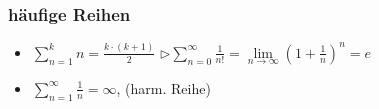     \subsubsection{häufige Reihen}
        \vspace{0em}
        \begin{itemize}
            \item $\displaystyle \sum_{n=1}^{k} n = \frac{k \cdot (k + 1)}{2} $ \hspace*{0em} $\triangleright \displaystyle \sum_{n=0}^{\infty} \frac{1}{n!} = \lim\limits_{n \rightarrow \infty} \left(1 + \frac{1}{n}\right)^n = e$
            \item $\displaystyle \sum_{n=1}^{\infty} \frac{1}{n} = \infty$, (harm. Reihe)
        \end{itemize}
        